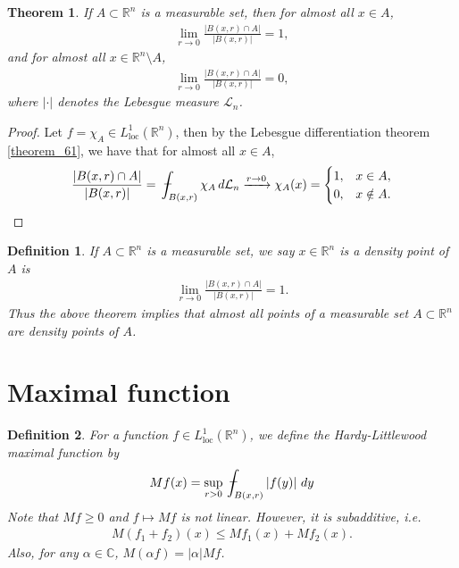 \documentclass[11pt]{book}
\newtheorem{definition}{Definition}[chapter]
\newtheorem{theorem}{Theorem}[chapter]
\theoremstyle{definition}
\numberwithin{equation}{chapter}
\def\L{{\mathcal L}}
\def\avint{\,\ThisStyle{\ensurestackMath{%
  \stackinset{c}{.2\LMpt}{c}{1\LMpt}{\SavedStyle-}{\SavedStyle\phantom{\int}}}%
  \setbox0=\hbox{$\SavedStyle\int\,$}\kern-\wd0}\int}
\begin{document}
\medskip

\begin{theorem}
If $A \subset \mathbb{R}^n$ is a measurable set, then for almost all $x \in A$,
\begin{align*}
    \lim_{r \to 0} \frac{\left|B(x,r) \cap A\right|}{\left|B(x,r)\right|} = 1,
\end{align*}
and for almost all $x \in \mathbb{R}^n \setminus A$,
\begin{align*}
    \lim_{r \to 0} \frac{\left|B(x,r) \cap A\right|}{\left|B(x,r)\right|} = 0, 
\end{align*}
where $\left|\cdot\right|$ denotes the Lebesgue measure $\L_n$.
\end{theorem}
\begin{proof}
Let $f = \chi_A \in L^1_{\operatorname{loc}}(\mathbb{R}^n)$, then by the Lebesgue differentiation theorem \ref{theorem_61}, we have that for almost all $x \in A$,
\begin{align*}
    \frac{\left|B(x,r) \cap A \right|}{\left|B(x,r)\right|} = \avint_{B(x,r)} \chi_A \,d\L_n \xrightarrow[]{r \to 0} \chi_A(x) = \begin{cases}
        1, & x \in A,\\
        0, & x \notin A.
    \end{cases}
\end{align*}
\end{proof}

\medskip

\begin{definition}
If $A \subset \mathbb{R}^n$ is a measurable set, we say $x \in \mathbb{R}^n$ is a density point of $A$ is
\begin{align*}
    \lim_{r \to 0} \frac{\left|B(x,r) \cap A\right|}{\left|B(x,r)\right|} = 1.
\end{align*}
Thus the above theorem implies that almost all points of a measurable set $A \subset \mathbb{R}^n$ are density points of $A$.
\end{definition}

\medskip

\section{Maximal function}

\begin{definition}
For a function $f \in L^1_{\operatorname{loc}}(\mathbb{R}^n)$, we define the Hardy-Littlewood maximal function by
\begin{align*}
    Mf(x) = \sup_{r > 0} \avint_{B(x,r)} \left|f(y)\right| \,dy
\end{align*}
Note that $Mf \geq 0$ and $f \mapsto Mf$ is not linear. However, it is subadditive, i.e. 
\begin{align*}
    M(f_1 + f_2)(x) \leq Mf_1(x) + Mf_2(x).
\end{align*}
Also, for any $\alpha \in \mathbb{C}$, $M(\alpha f) = \left|\alpha\right| Mf$.
\end{definition}
\end{document}
